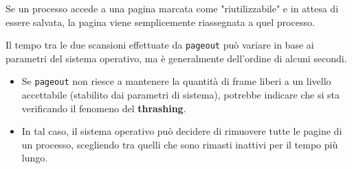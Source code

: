 Se un processo accede a una pagina marcata come "riutilizzabile" e in attesa di essere salvata, la pagina viene semplicemente riassegnata a quel processo.

Il tempo tra le due scansioni effettuate da \texttt{pageout} può variare in base ai parametri del sistema operativo, ma è generalmente dell'ordine di alcuni secondi.

\begin{itemize}
    \item Se \texttt{pageout} non riesce a mantenere la quantità di frame liberi a un livello accettabile (stabilito dai parametri di sistema), potrebbe indicare che si sta verificando il fenomeno del \textbf{thrashing}.
    \item In tal caso, il sistema operativo può decidere di rimuovere tutte le pagine di un processo, scegliendo tra quelli che sono rimasti inattivi per il tempo più lungo.
\end{itemize}
